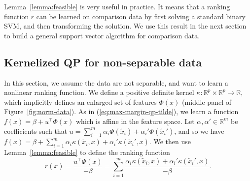 \documentclass{article}
\newcommand{\RR}{\mathbb R}
\begin{document}
Lemma~\ref{lemma:feasible} is very useful in practice. It means that a
ranking function $r$ can be learned on comparison data by first
solving a standard binary SVM, and then transforming the solution. We
use this result in the next section to build a general support vector
algorithm for comparison data.

\subsection{Kernelized QP for non-separable data}
\label{sec:kernelized-qp}
In this section, we assume the data are not separable, and want to
learn a nonlinear ranking function. We define a positive
definite kernel $\kappa:\RR^p\times \RR^p\rightarrow\RR$, which
implicitly defines an enlarged set of features $\Phi(x)$ (middle panel
of Figure~\ref{fig:norm-data}). As in (\ref{eq:max-margin-qp-tilde}),
we learn a function $f(x)=\beta + u^\intercal \Phi(x)$ which is affine
in the feature space. Let $\alpha,\alpha'\in\RR^m$ be coefficients
such that $u=\sum_{i=1}^m \alpha_i \Phi(\tilde x_i) + \alpha_i'
\Phi(\tilde x_i')$, and so we have
 $f(x) =\beta + \sum_{i=1}^m \alpha_i \kappa(\tilde x_i, x) +
\alpha_i' \kappa(\tilde x_i', x)$. We then use Lemma~\ref{lemma:feasible} to
define the ranking function
\begin{equation}
  \label{eq:kernelized_r}
  r(x)= \frac{u^\intercal \Phi(x)}{-\beta} = %
  \sum_{i=1}^m
  \frac{\alpha_i \kappa(\tilde x_i, x) + \alpha_i'  \kappa(\tilde x_i', x)}
{-\beta}.
\end{equation}
\end{document}
